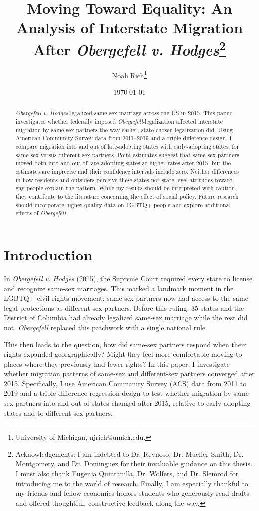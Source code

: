 \documentclass[12pt,letterpaper]{article}
\title{Moving Toward Equality: An Analysis of Interstate Migration After \textit{Obergefell v. Hodges}\footnote{Acknowledgements: I am indebted to Dr. Reynoso, Dr. Mueller-Smith, Dr. Montgomery, and Dr. Dominguez for their invaluable guidance on this thesis. I must also thank Eugenia Quintanilla, Dr. Wolfers, and Dr. Slemrod for introducing me to the world of research. Finally, I am especially thankful to my friends and fellow economics honors students who generously read drafts and offered thoughtful, constructive feedback along the way.}}
\author{Noah Rich\footnote{University of Michigan, njrich@umich.edu.}}
\date{\today}
\begin{document}
\doublespacing

\maketitle


\begin{abstract}
\textit{Obergefell v. Hodges} legalized same-sex marriage across the US in 2015. This paper investigates whether federally imposed \textit{Obergefell}-legalization affected interstate migration by same-sex partners the way earlier, state-chosen legalization did. Using American Community Survey data from 2011–2019 and a triple-difference design, I compare migration into and out of late-adopting states with early-adopting states, for same-sex versus different-sex partners. Point estimates suggest that same-sex partners moved both into and out of late-adopting states at higher rates after 2015, but the estimates are imprecise and their confidence intervals include zero. Neither differences in how residents and outsiders perceive these states nor state-level attitudes toward gay people explain the pattern. While my results should be interpreted with caution, they contribute to the literature concerning the effect of social policy. Future research should incorporate higher-quality data on LGBTQ+ people and explore additional effects of \textit{Obergefell}.
\end{abstract}

\newpage

\section{Introduction}

In \textit{Obergefell v. Hodges} (2015), the Supreme Court required every state to license and recognize same-sex marriages. This marked a landmark moment in the LGBTQ+ civil rights movement: same-sex partners now had access to the same legal protections as different-sex partners. Before this ruling, 35 states and the District of Columbia had already legalized same-sex marriage while the rest did not. \textit{Obergefell} replaced this patchwork with a single national rule.

This then leads to the question, how did same-sex partners respond when their rights expanded georgraphically? Might they feel more comfortable moving to places where they previously had fewer rights? In this paper, I investigate whether migration patterns of same-sex and different-sex partners converged after 2015. Specifically, I use American Community Survey (ACS) data from 2011 to 2019 and a triple-difference regression design to test whether migration by same-sex partners into and out of  states changed after 2015, relative to early-adopting states and to different-sex partners.
\end{document}
